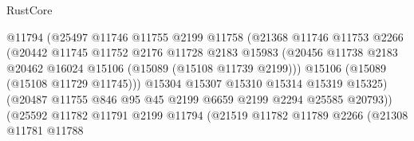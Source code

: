 \begin{lexlean}{RustCore}
\begin{coremodule}
                                    @11794
                                    (@25497
                                      @11746
                                      @11755
                                      @2199
                                      @11758
                                      (@21368
                                        @11746
                                        @11753
                                        @2266
                                        (@20442
                                          @11745
                                          @11752
                                          @2176
                                          @11728
                                          @2183
                                          @15983
                                          (@20456
                                            @11738
                                            @2183
                                            @20462
                                            @16024
                                            @15106
                                            (@15089 (@15108 @11739 @2199)))
                                          @15106
                                          (@15089 (@15108 @11729 @11745)))
                                        @15304
                                        @15307
                                        @15310
                                        @15314
                                        @15319
                                        @15325)
                                      (@20487
                                        @11755
                                        @846
                                        @95
                                        @45
                                        @2199
                                        @6659
                                        @2199
                                        @2294
                                        @25585
                                        @20793))
                                    (@25592
                                      @11782
                                      @11791
                                      @2199
                                      @11794
                                      (@21519
                                        @11782
                                        @11789
                                        @2266
                                        (@21308
                                          @11781
                                          @11788

\end{coremodule}
\end{lexlean}
